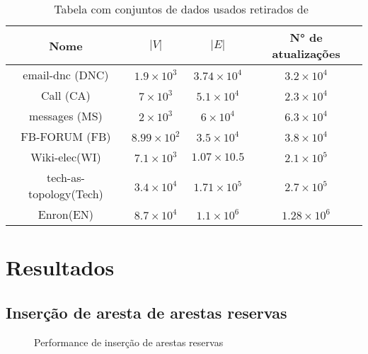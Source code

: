 \begin{table}
\begin{center}
\begin{tabular}{ |c|c|c|c| } 
 \hline
	Nome & $|V|$ & $|E|$ & N° de atualizações\\
 \hline
	email-dnc (DNC)\cite{nr-aaai15}&$1.9\times 10^3$&$3.74\times 10^4$&$3.2\times 10^4$\\
 \hline
	Call (CA)\cite{nr-aaai15}&$7\times 10^3$&$5.1\times 10^4$&$2.3\times 10^4$\\
 \hline
	messages (MS)\cite{nr-aaai15}&$2\times 10^3$&$6\times 10^4$&$6.3\times 10^4$\\
 \hline
	FB-FORUM (FB)\cite{nr-aaai15}&$8.99\times 10^2$&$3.5\times 10^4$&$3.8\times 10^4$\\
 \hline
	Wiki-elec(WI)\cite{nr-aaai15}&$7.1\times 10^3$&$1.07\times 10.5$&$2.1\times 10^5$\\
 \hline
	tech-as-topology(Tech)\cite{nr-aaai15}&$3.4\times 10^4$&$1.71\times 10^5$&$2.7\times 10^5$\\
 \hline
	Enron(EN)\cite{nr-aaai15}&$8.7\times 10^4$&$1.1\times 10^6$&$1.28\times 10^6$\\
 \hline
\end{tabular}
\caption{Tabela com conjuntos de dados usados retirados de~\cite{nr-aaai15}}
\label{tab:datasets}
\end{center}
\end{table}



\section{Resultados}


\newpage

\subsection{Inserção de aresta de arestas reservas}
\legenda
\begin{figure}
\caption{Performance de inserção de arestas reservas}
\end{figure}



